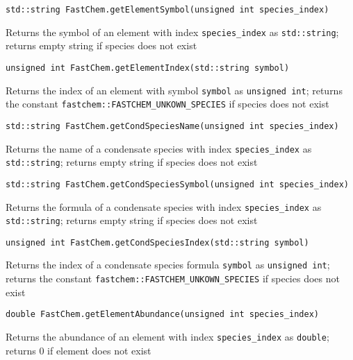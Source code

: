 \documentclass[numbers=noenddot]{aux/fcmanual}
\begin{document}
\lstinline!std::string FastChem.getElementSymbol(unsigned int species_index)!
\begin{addmargin}[25pt]{0pt}
	Returns the symbol of an element with index \lstinline!species_index! as \lstinline!std::string!; returns empty string if species does not exist
\end{addmargin}

\bigbreak

\lstinline!unsigned int FastChem.getElementIndex(std::string symbol)!
\begin{addmargin}[25pt]{0pt}
	Returns the index of an element with symbol \lstinline!symbol! as \lstinline!unsigned int!; returns the constant \lstinline!fastchem::FASTCHEM_UNKOWN_SPECIES! if species does not exist
\end{addmargin}



\bigbreak

\lstinline!std::string FastChem.getCondSpeciesName(unsigned int species_index)!
\begin{addmargin}[25pt]{0pt}
	Returns the name of a condensate species with index \lstinline!species_index! as \lstinline!std::string!; returns empty string if species does not exist
\end{addmargin}  

\bigbreak

\lstinline!std::string FastChem.getCondSpeciesSymbol(unsigned int species_index)!
\begin{addmargin}[25pt]{0pt}
	Returns the formula of a condensate species with index \lstinline!species_index! as \lstinline!std::string!; returns empty string if species does not exist
\end{addmargin}

\bigbreak

\lstinline!unsigned int FastChem.getCondSpeciesIndex(std::string symbol)!
\begin{addmargin}[25pt]{0pt}
	Returns the index of a condensate species formula \lstinline!symbol! as \lstinline!unsigned int!; returns the constant \lstinline!fastchem::FASTCHEM_UNKOWN_SPECIES! if species does not exist
\end{addmargin}


\bigbreak

\lstinline!double FastChem.getElementAbundance(unsigned int species_index)!
\begin{addmargin}[25pt]{0pt}
  Returns the abundance of an element with index \lstinline!species_index! as \lstinline!double!; returns 0 if element does not exist
\end{addmargin}
\end{document}
